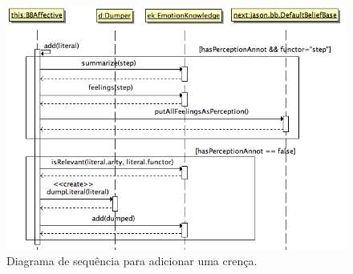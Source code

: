 \begin{figure}
  \centering
  \includegraphics[width=12cm]{figuras/addB.png}
  \caption{Diagrama de sequência para adicionar uma crença.}
  \label{fig:addBelief}
\end{figure}

